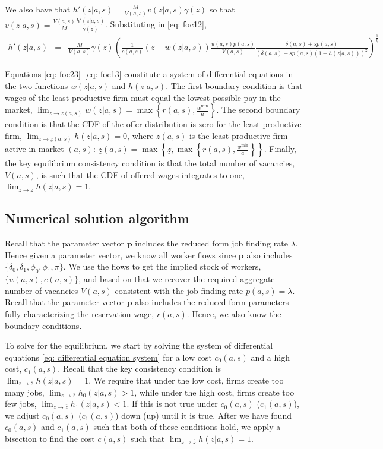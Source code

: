 We also have that $h'(z|a,s)=\frac{M}{V(a,s)} v(z|a,s) \gamma(z)$ so that $v(z|a,s)=\frac{V(a,s)}{M} \frac{h'(z|a,s)}{\gamma(z)}$. Substituting in \eqref{eq: foc12},
\begin{eqnarray}\label{eq: foc13}
h'(z|a,s) &=& \frac{M}{V(a,s)} \gamma(z)  \left(\frac{1}{c(a,s)}\left(z-w(z|a,s)\right) \frac{u(a,s) p(a,s) }{V(a,s)} \frac{\delta(a,s) + sp(a,s)}{\left(\delta(a,s)+sp(a,s)(1-h(z|a,s))\right)^2}\right)^{\frac{1}{\eta}}
\end{eqnarray}

Equations \eqref{eq: foc23}--\eqref{eq: foc13} constitute a system of differential equations in the two functions $w(z|a,s)$ and $h(z|a,s)$. The first boundary condition is that wages of the least productive firm must equal the lowest possible pay in the market, $\lim_{z\to \underline{z}(a,s)} w(z|a,s)=\max\left\{ r(a,s),\frac{w^{\text{min}}}{a} \right\}$. The second boundary condition is that the CDF of the offer distribution is zero for the least productive firm, $\lim_{z\to \underline{z}(a,s)} h(z|a,s)=0$, where $\underline{z}(a,s)$ is the least productive firm active in market $(a,s)$: $\underline{z}(a,s)=\max \left\{\underline{z},\max\left\{r(a,s),\frac{w^{\text{min}}}{a}\right\}\right\}$. Finally, the key equilibrium consistency condition is that the total number of vacancies, $V(a,s)$, is such that the CDF of offered wages integrates to one, $\lim_{z\to\overline{z}} h(z|a,s) = 1$.




\clearpage
\subsection{Numerical solution algorithm\label{app_subsec:algorithm}}
Recall that the parameter vector $\mathbf{p}$ includes the reduced form job finding rate $\lambda$. Hence given a parameter vector, we know all worker flows since $\mathbf{p}$ also includes $\{\delta_0,\delta_1,\phi_0,\phi_1,\pi\}$. We use the flows to get the implied stock of workers, $\{u(a,s),e(a,s)\}$, and based on that we recover the required aggregate number of vacancies $V(a,s)$ consistent with the job finding rate $p(a,s)=\lambda$. Recall that the parameter vector $\mathbf{p}$ also includes the reduced form parameters fully characterizing the reservation wage, $r(a,s)$. Hence, we also know the boundary conditions.

To solve for the equilibrium, we start by solving the system of differential equations \eqref{eq: differential equation system} for a low cost $c_0(a,s)$ and a high cost, $c_1(a,s)$. Recall that the key consistency condition is $\lim_{z\to\overline{z}} h(z|a,s) = 1$. We require that under the low cost, firms create too many jobs, $\lim_{z\to\overline{z}} h_0(z|a,s) > 1$, while under the high cost, firms create too few jobs, $\lim_{z\to\overline{z}} h_1(z|a,s) < 1$. If this is not true under $c_0(a,s)$ ($c_1(a,s)$), we adjust $c_0(a,s)$ ($c_1(a,s)$) down (up) until it is true. After we have found $c_0(a,s)$ and $c_1(a,s)$ such that both of these conditions hold, we apply a bisection to find the cost $c(a,s)$ such that $\lim_{z\to\overline{z}} h(z|a,s) = 1$.

